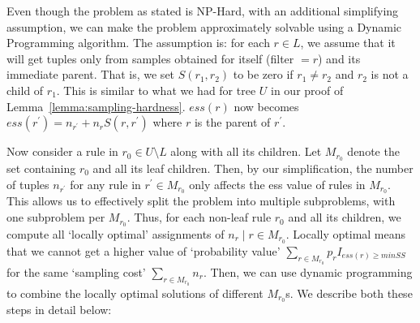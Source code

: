  Even though the problem as stated is {\sc NP-Hard}, with an additional simplifying assumption, we can make the problem approximately solvable using a Dynamic Programming algorithm. The assumption is: for each $r \in L$, we assume that it will get tuples only from samples obtained for itself (filter $= r$) and its immediate parent. That is, we set $S(r_1, r_2)$ to be zero if $r_1 \neq r_2$ and $r_2$ is not a child of $r_1$. This is similar to what we had for tree $U$ in our proof of Lemma~\ref{lemma:sampling-hardness}. $ess(r)$ now becomes $ess(r^{\prime}) = n_{r^{\prime}} + n_rS(r, r^{\prime})$ where $r$ is the parent of $r^{\prime}$.

Now consider a rule in $r_0 \in U \setminus L$ along with all its children. Let $M_{r_0}$ denote the set containing $r_0$ and all its leaf children. Then, by our simplification, the number of tuples $n_{r^{\prime}}$ for any rule in $r^{\prime} \in M_{r_0}$ only affects the ess value of rules in $M_{r_0}$. This allows us to effectively split the problem into multiple subproblems,  with one subproblem per $M_{r_0}$. Thus, for each non-leaf rule $r_0$ and all its children, we compute all `locally optimal' assignments of $n_r \mid r \in M_{r_0}$. Locally optimal means that we cannot get a higher value of `probability value' $\sum_{r \in M_{r_0}} p_rI_{ess(r) \geq minSS}$ for the same `sampling cost' $\sum_{r\in M_{r_0}} n_r$. Then, we can use dynamic programming to combine the locally optimal solutions of different $M_{r_0}$s. We describe both these steps in detail below:

